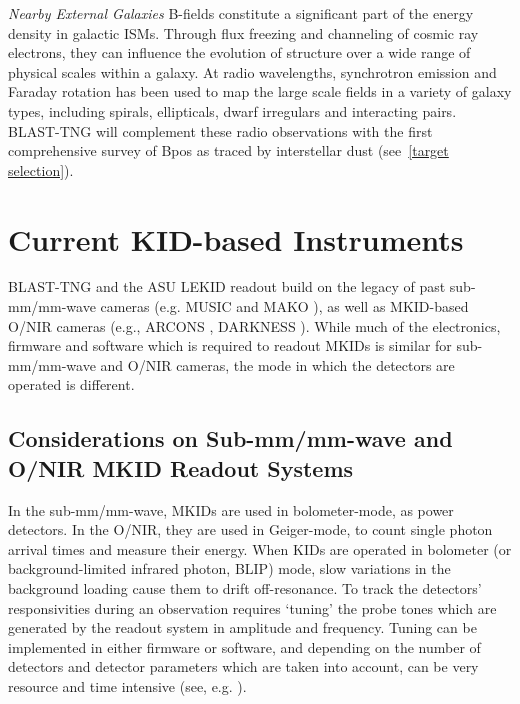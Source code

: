 {\vspace{5mm}

\textit{Nearby External Galaxies} B-fields constitute a significant part of the energy density in galactic ISMs. Through flux freezing and channeling of cosmic ray electrons, they can influence the evolution of structure over a wide range of physical scales within a galaxy. At radio wavelengths, synchrotron emission and Faraday rotation has been used to map the large scale fields in a variety of galaxy types, including spirals, ellipticals, dwarf irregulars and interacting pairs. BLAST-TNG will complement these radio observations with the first comprehensive survey of \gls{Bpos} as traced by interstellar dust (see~\ref{target selection}).

\section{Current KID-based Instruments}\label{kid cameras}

BLAST-TNG and the ASU LEKID readout build on the legacy of past sub-mm/mm-wave cameras (e.g. MUSIC \citep{golwala2012status} and MAKO \citep{swenson2012mako}), as well as MKID-based O/NIR cameras (e.g., ARCONS \citep{mazin2013arcons}, DARKNESS \citep{meeker2018darkness,strader2016digitial}). While much of the electronics, firmware and software which is required to readout MKIDs is similar for sub-mm/mm-wave and O/NIR cameras, the mode in which the detectors are operated is different.

\subsection{Considerations on Sub-mm/mm-wave and O/NIR MKID Readout Systems}

In the sub-mm/mm-wave, MKIDs are used in bolometer-mode, as power detectors. In the O/NIR, they are used in Geiger-mode, to count single photon arrival times and measure their energy. When KIDs are operated in bolometer (or background-limited infrared photon, BLIP) mode, slow variations in the background loading cause them to drift off-resonance. To track the detectors' responsivities during an observation requires `tuning' the probe tones which are generated by the readout system in amplitude and frequency. Tuning can be implemented in either firmware or software, and depending on the number of detectors and detector parameters which are taken into account, can be very resource and time intensive (see, e.g. \citet{dodkins2018mkid}).

}
